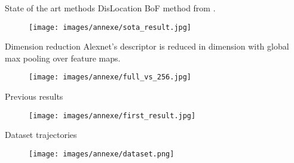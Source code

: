 \begin{frame}{State of the art methods}
	DisLocation BoF method from \cite{Arandjelovic2014}.
	\vfill
	\begin{figure}[c]
		\texttt{[image: images/annexe/sota\_result.jpg]}
	\end{figure}
\end{frame}

\begin{frame}{Dimension reduction}
	Alexnet's descriptor is reduced in dimension with global max pooling over feature maps.
	\vfill
	\begin{figure}[c]
		\texttt{[image: images/annexe/full\_vs\_256.jpg]}
	\end{figure}
\end{frame}

\begin{frame}{Previous results}
	\begin{figure}[c]
		\texttt{[image: images/annexe/first\_result.jpg]}
	\end{figure}
\end{frame}

\begin{frame}{Dataset trajectories}
	\begin{figure}[c]
		\texttt{[image: images/annexe/dataset.png]}
	\end{figure}
\end{frame}


